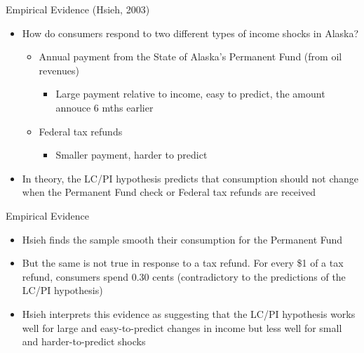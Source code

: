 \documentclass[aspectratio=1610]{beamer}
\begin{document}
\begin{frame}[wide]{Empirical Evidence (Hsieh, 2003)}
	\begin{itemize}
		\item How do consumers respond to two different types of income shocks in Alaska?
		\vspace{3mm}
		\begin{itemize}
			\item Annual payment from the State of Alaska’s Permanent Fund (from oil revenues)
			\vspace{2mm}
			\begin{itemize}
				\item Large payment relative to income, easy to predict, the amount annouce 6 mths earlier
			\end{itemize}
			\vspace{2mm}
			\item Federal tax refunds
			\vspace{2mm}
			\begin{itemize}
				\item Smaller payment, harder to predict
			\end{itemize}
		\end{itemize}
		\vspace{2mm}
		\item In theory, the LC/PI hypothesis predicts that consumption should not change when the Permanent Fund check or Federal tax refunds are received
	\end{itemize}
\end{frame}

\begin{frame}[wide]{Empirical Evidence}
	\begin{itemize}
		\item Hsieh finds the sample smooth their consumption for the Permanent Fund
		\item But the same is not true in response to a tax refund. For every \$1 of a tax refund, consumers spend 0.30 cents (contradictory to the predictions of the LC/PI hypothesis)
		\item Hsieh interprets this evidence as suggesting that the LC/PI hypothesis works well for large and easy-to-predict changes in income but less well for small and harder-to-predict shocks
	\end{itemize}
\end{frame}
\end{document}
